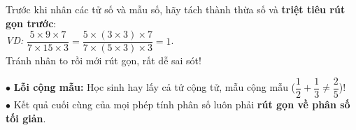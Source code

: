 \documentclass[14pt,a4paper,oneside]{extbook}
\begin{document}
\noindent
\begin{minipage}[t]{0.54\textwidth}
  \begin{tcolorbox}[
    enhanced,
    title={\footnotesize\bfseries\color{white}\faBolt\ Mẹo triệt tiêu khi nhân phân số},
    colback=green!3!white,
    colframe=green!60!black,
    arc=2.5mm, boxrule=0.8pt, top=1.8mm, bottom=1.8mm, left=2.2mm, right=2.2mm
  ]
    \footnotesize
    Trước khi nhân các tử số và mẫu số, hãy tách thành thừa số và \textbf{triệt tiêu rút gọn trước}:\\
    \textit{VD:} $\dfrac{5 \times 9 \times 7}{7 \times 15 \times 3} = \dfrac{5 \times (3 \times 3) \times 7}{7 \times (5 \times 3) \times 3} = 1$.\\
    Tránh nhân to rồi mới rút gọn, rất dễ sai sót!
  \end{tcolorbox}
\end{minipage}%
\hfill
\begin{minipage}[t]{0.44\textwidth}
  \begin{tcolorbox}[
    enhanced,
    title={\footnotesize\bfseries\color{white}\faExclamationTriangle\ Mẹo tránh bẫy trắc nghiệm},
    colback=red!2!white,
    colframe=red!70!black,
    arc=2.5mm, boxrule=0.8pt, top=1.8mm, bottom=1.8mm, left=2.2mm, right=2.2mm
  ]
    \footnotesize
    $\bullet$ \textbf{Lỗi cộng mẫu:} Học sinh hay lấy cả tử cộng tử, mẫu cộng mẫu ($\dfrac{1}{2} + \dfrac{1}{3} \neq \dfrac{2}{5}$)!\\
    $\bullet$ Kết quả cuối cùng của mọi phép tính phân số luôn phải \textbf{rút gọn về phân số tối giản}.
  \end{tcolorbox}
\end{minipage}
\end{document}
